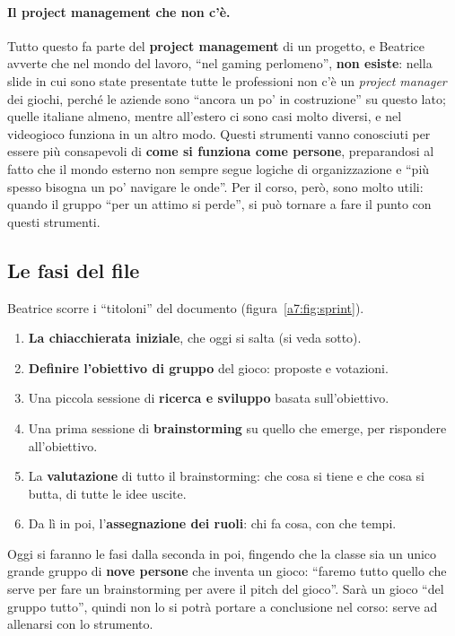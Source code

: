 \paragraph{Il project management che non c'è.} Tutto questo fa parte del
\textbf{project management} di un progetto, e Beatrice avverte che nel mondo del
lavoro, ``nel gaming perlomeno'', \textbf{non esiste}: nella slide in cui sono state
presentate tutte le professioni non c'è un \emph{project manager} dei giochi, perché
le aziende sono ``ancora un po' in costruzione'' su questo lato; quelle italiane
almeno, mentre all'estero ci sono casi molto diversi, e nel videogioco funziona in un
altro modo. Questi strumenti vanno conosciuti per essere più consapevoli di
\textbf{come si funziona come persone}, preparandosi al fatto che il mondo esterno
non sempre segue logiche di organizzazione e ``più spesso bisogna un po' navigare le
onde''. Per il corso, però, sono molto utili: quando il gruppo ``per un attimo si
perde'', si può tornare a fare il punto con questi strumenti.

\subsection{Le fasi del file}
\label{a7:sec:fasi-file}

Beatrice scorre i ``titoloni'' del documento (figura~\ref{a7:fig:sprint}).
\begin{enumerate}
  \item \textbf{La chiacchierata iniziale}, che oggi si salta (si veda sotto).
  \item \textbf{Definire l'obiettivo di gruppo} del gioco: proposte e votazioni.
  \item Una piccola sessione di \textbf{ricerca e sviluppo} basata sull'obiettivo.
  \item Una prima sessione di \textbf{brainstorming} su quello che emerge, per
        rispondere all'obiettivo.
  \item La \textbf{valutazione} di tutto il brainstorming: che cosa si tiene e che
        cosa si butta, di tutte le idee uscite.
  \item Da lì in poi, l'\textbf{assegnazione dei ruoli}: chi fa cosa, con che tempi.
\end{enumerate}
Oggi si faranno le fasi dalla seconda in poi, fingendo che la classe sia un unico
grande gruppo di \textbf{nove persone} che inventa un gioco: ``faremo tutto quello
che serve per fare un brainstorming per avere il pitch del gioco''. Sarà un gioco
``del gruppo tutto'', quindi non lo si potrà portare a conclusione nel corso: serve
ad allenarsi con lo strumento.

